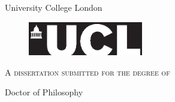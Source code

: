% 
% 
% 
%
%

\pagestyle{empty}                       %

\begin{center}
\vspace*{1cm}
{\Huge\bf \thetitle}\\ %
\vspace*{3cm}
{\Large \theauthor}\\ %
\vspace*{2cm}

\vfill

{\Large University College London}

\vspace*{1.5cm}
\begin{figure}[h!]
 \centering
 \includegraphics[width=50mm]{logos/ucllogo-black.eps}
\end{figure}
\vspace*{1.5cm}
\textsc{A dissertation submitted for the degree of}

Doctor of Philosophy
\monthname{} \the\year
\end{center}

\newpage
\pagestyle{plain}                               %